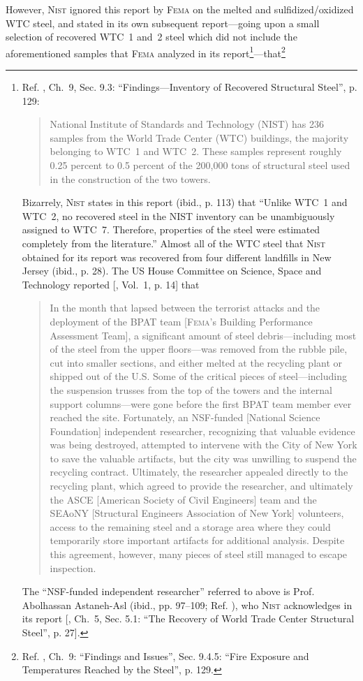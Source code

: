 \documentclass[letterpaper,12pt]{article}
\begin{document}
However, \textsc{Nist} ignored this report by \textsc{Fema} on the melted and sulfidized\slash oxidized WTC steel, and stated in its own subsequent report---going upon a small selection of recovered WTC~1 and~2 steel which did not include the aforementioned samples that \textsc{Fema} analyzed in its report\footnote{Ref. , Ch.~9, Sec. 9.3: ``Findings---Inventory of Recovered Structural Steel'', p. 129: \begin{quote}
National Institute of Standards and Technology (NIST) has 236 samples from the World Trade Center (WTC) buildings, the majority belonging to WTC~1 and WTC~2. These samples represent roughly 0.25 percent to 0.5 percent of the 200,000 tons of structural steel used in the construction of the two towers.
\end{quote} Bizarrely, \textsc{Nist} states in this report (ibid., p. 113) that ``Unlike WTC~1 and WTC~2, no recovered steel in the NIST inventory can be unambiguously assigned to WTC~7. Therefore, properties of the steel were estimated completely from the literature.'' Almost all of the WTC steel that \textsc{Nist} obtained for its report was recovered from four different landfills in New Jersey (ibid., p. 28). The US House Committee on Science, Space and Technology reported [, Vol.~1, p. 14] that\begin{quote}
In the month that lapsed between the terrorist attacks and the deployment of the BPAT team [\textsc{Fema}'s Building Performance Assessment Team], a significant amount of steel debris---including most of the steel from the upper floors---was removed from the rubble pile, cut into smaller sections, and either melted at the recycling plant or shipped out of the U.S. Some of the critical pieces of steel---including the suspension trusses from the top of the towers and the internal support columns---were gone before the first BPAT team member ever reached the site. Fortunately, an NSF-funded [National Science Foundation] independent researcher, recognizing that valuable evidence was being destroyed, attempted to intervene with the City of New York to save the valuable artifacts, but the city was unwilling to suspend the recycling contract. Ultimately, the researcher appealed directly to the recycling plant, which agreed to provide the researcher, and ultimately the ASCE [American Society of Civil Engineers] team and the SEAoNY [Structural Engineers Association of New York] volunteers, access to the remaining steel and a storage area where they could temporarily store important artifacts for additional analysis. Despite this agreement, however, many pieces of steel still managed to escape inspection.
\end{quote} The ``NSF-funded independent researcher'' referred to above is Prof. Abolhassan Astaneh-Asl (ibid., pp. 97--109; Ref. ), who \textsc{Nist} acknowledges in its report [, Ch.~5, Sec. 5.1: ``The Recovery of World Trade Center Structural Steel'', p. 27].}---that\footnote{Ref. , Ch.~9: ``Findings and Issues'', Sec. 9.4.5: ``Fire Exposure and Temperatures Reached by the Steel'', p. 129.}
\end{document}
